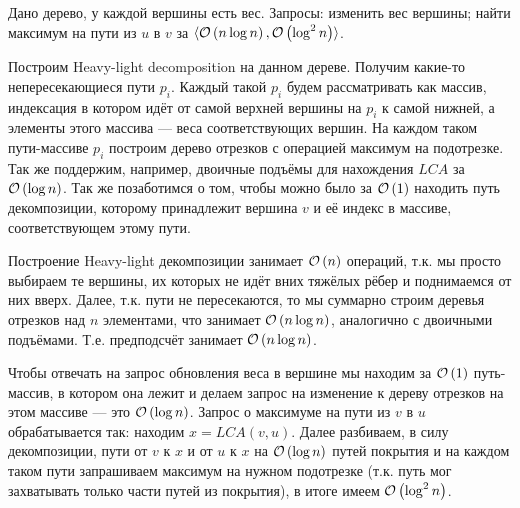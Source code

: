 \begin{task}[2]
	Дано дерево, у каждой вершины есть вес. Запросы: изменить вес вершины; найти максимум на пути из $u$ в $v$ за $\langle \mathcal{O}\left(n\log{n}\right), \mathcal{O}\left(\log^2{n}\right) \rangle$.
\end{task}
\begin{solution}
	Построим Heavy-light decomposition на данном дереве. Получим какие-то непересекающиеся пути $p_i$. Каждый такой $p_i$ будем рассматривать как массив, индексация в котором идёт от самой верхней вершины на $p_i$ к самой нижней, а элементы этого массива --- веса соответствующих вершин. На каждом таком пути-массиве $p_i$ построим дерево отрезков с операцией максимум на подотрезке. Так же поддержим, например, двоичные подъёмы для нахождения $LCA$ за $\mathcal{O}\left(\log{n}\right)$. Так же позаботимся о том, чтобы можно было за $\mathcal{O}\left(1\right)$ находить путь декомпозиции, которому принадлежит вершина $v$ и её индекс в массиве, соответствующем этому пути.

	Построение Heavy-light декомпозиции занимает $\mathcal{O}\left(n\right)$ операций, т.к. мы просто выбираем те вершины, их которых не идёт вних тяжёлых рёбер и поднимаемся от них вверх. Далее, т.к. пути не пересекаются, то мы суммарно строим деревья отрезков над $n$ элементами, что занимает $\mathcal{O}\left(n\log{n}\right)$, аналогично с двоичными подъёмами. Т.е. предподсчёт занимает $\mathcal{O}\left(n\log{n}\right)$.

	Чтобы отвечать на запрос обновления веса в вершине мы находим за $\mathcal{O}\left(1\right)$ путь-массив, в котором она лежит и делаем запрос на изменение к дереву отрезков на этом массиве --- это $\mathcal{O}\left(\log{n}\right)$. Запрос о максимуме на пути из $v$ в $u$ обрабатывается так: находим $x = LCA(v,u)$. Далее разбиваем, в силу декомпозиции, пути от $v$ к $x$ и от $u$ к $x$ на $\mathcal{O}\left(\log{n}\right)$ путей покрытия и на каждом таком пути запрашиваем максимум на нужном подотрезке (т.к. путь мог захватывать только части путей из покрытия), в итоге имеем $\mathcal{O}\left(\log^2{n}\right)$. \xqed
\end{solution}

